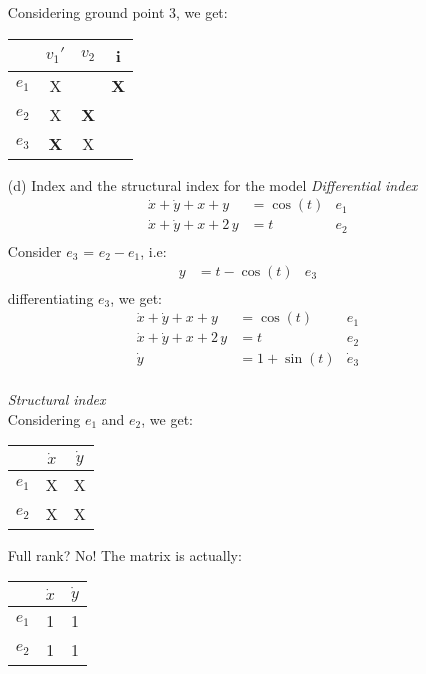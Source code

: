 \begin{enumerate}
	Considering ground point 3, we get:
	\begin{center}
		\begin{tabular}{c|c c c}
			& $v_1'$ & $v_2$ & i \\
			\hline
			$e_1$ & X &  & \textbf{X} \\
			$e_2$ & X & \textbf{X} &  \\
			$e_3$ & \textbf{X} & X &  \\
		\end{tabular} 
	\end{center}
	
	
	\item[(d)]  Index and the structural index for the model
	\textit{Differential index}
	\begin{align*}
		\dot x + \dot y + x + y &= \cos(t) & e_1\\
		\dot x + \dot y + x + 2\,y &= t & e_2\\		
	\end{align*}
	Consider $e_3$ = $e_2 - e_1$, i.e:
	\begin{align*}
		y &= t - \cos(t) & e_3\\
	\end{align*}
	differentiating $e_3$, we get:
	\begin{align*}
		\dot x + \dot y + x + y &= \cos(t) & e_1\\
		\dot x + \dot y + x + 2\,y &= t & e_2\\	
		\dot y &= 1 + \sin(t) & \dot e_3\\
	\end{align*}	
	
	\textit{Structural index}\\
	Considering $e_1$ and $e_2$, we get:
	\begin{center}
		\begin{tabular}{c|c c}
			& $\dot x$ & $\dot y$ \\
			\hline
			$e_1$ & X & X \\
			$e_2$ & X & X 
		\end{tabular}  Full rank? No! The matrix is actually: \begin{tabular}{c|c c}
			& $\dot x$ & $\dot y$ \\
			\hline
			$e_1$ & 1 & 1 \\
			$e_2$ & 1 & 1 
		\end{tabular} 
	\end{center}	
	

\end{enumerate}
